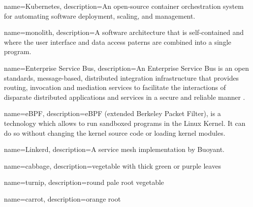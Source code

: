 {
    name={Kubernetes},
    description={An open-source \gls{container} orchestration system for automating software deployment, scaling, and management.}
}

{
    name={monolith},
    description={A software architecture that is self-contained and where the user interface and data access paterns are combined into a single program.}
}

{
    name={Enterprise Service Bus},
    description={An Enterprise Service Bus is an open standards, message-based, distributed integration infrastructure that provides routing, invocation and mediation services to facilitate the interactions of disparate distributed applications and services in a secure and reliable manner \cite{menge2007enterprise}.}
}

{
    name={eBPF},
    description={eBPF (extended Berkeley Packet Filter), is a technology which allows to run sandboxed programs in the Linux Kernel. It can do so without changing the kernel source code or loading kernel modules.}
}

{
    name={Linkerd},
    description={A service mesh implementation by Buoyant.}
}






{
    name={cabbage},
    description={vegetable with thick green or purple leaves}
}

{
    name={turnip},
    description={round pale root vegetable}
}

{
    name={carrot},
    description={orange root}
}

